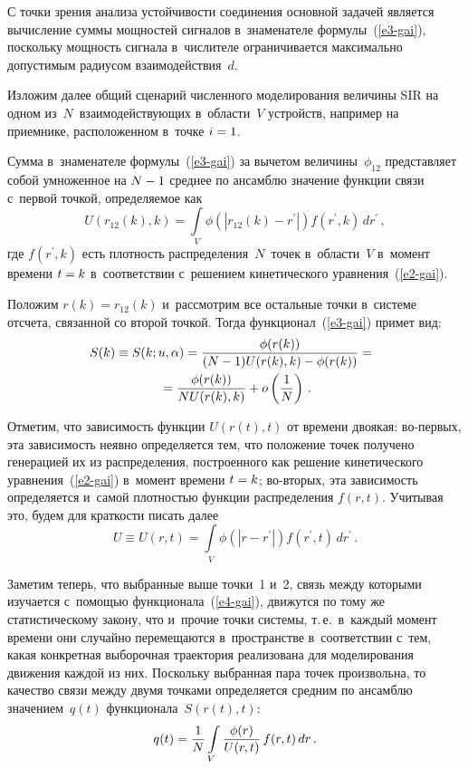 \begin{multicols}{2}
  С точки зрения анализа устойчивости соединения основной задачей является 
вычисление суммы мощностей сигналов в~знаменателе формулы~(\ref{e3-gai}), 
поскольку мощность сигнала в~числителе ограничивается максимально 
допустимым радиусом взаимодействия~$d$.
  
  Изложим далее общий сценарий численного моделирования величины SIR на 
одном из~$N$~взаимодействующих в~области~$V$ устройств, например на 
приемнике, расположенном в~точке $i\hm=1$.
  
  Сумма в~знаменателе формулы~(\ref{e3-gai}) за вычетом 
величины~$\phi_{12}$ представляет собой умноженное на $N\hm-1$ среднее по 
ансамблю значение функции связи с~первой точкой, определяемое как 
  $$
  U\left( r_{12}(k),k\right) =\int\limits_V \phi\left( \left\vert r_{12}(k)-
r^\prime\right\vert \right) f\left( r^\prime, k\right)\,dr^\prime\,,
  $$ 
где $f(r^\prime, k)$ есть плотность распределения~$N$~точек в~об\-ласти~$V$ 
в~момент времени $t\hm=k$ в~соответствии с~решением кинетического 
уравнения~(\ref{e2-gai}).

  Положим $r(k)=r_{12}(k)$ и~рассмотрим все остальные точки в~системе 
отсчета, связанной со второй точкой. Тогда функционал~(\ref{e3-gai}) примет 
вид:
  \begin{multline*}
 \hspace*{-4.2027pt} S(k)\equiv S(k;u,\alpha) = \displaystyle\frac{\displaystyle \phi(r(k))\mathstrut}{\displaystyle (N-1)U(r(k),k)-\phi(r(k))\mathstrut}= {}\\
  {}=
\displaystyle\frac{\displaystyle \phi(r(k))\mathstrut}{\displaystyle NU(r(k),k)\mathstrut}+o\left( \displaystyle\frac{\displaystyle 1\mathstrut}{\displaystyle N\mathstrut}\right)\,.
  \end{multline*}
  
  Отметим, что зависимость функции $U(r(t),t)$ от времени двоякая:  
во-пер\-вых, эта зависимость неявно определяется тем, что положение точек 
получено генерацией их из распределения, построенного как решение 
кинетического уравнения~(\ref{e2-gai}) в~момент времени $t\hm=k$;  
во-вто\-рых, эта зависимость определяется и~самой плот\-ностью функ\-ции
рас\-пре\-де\-ле\-ния $f(r,t)$. Учитывая это, 
будем для краткости писать далее
  \begin{equation}
  U\equiv U(r,t)=\int\limits_V \phi\left(\left\vert r-r^\prime\right\vert \right) 
f\left(r^\prime, t\right)\,dr^\prime\,.
  \label{e4-gai}
  \end{equation}
  
  Заметим теперь, что выбранные выше точки~1 и~2, связь между которыми 
изучается с~помощью функционала~(\ref{e4-gai}), движутся по тому же 
статистическому закону, что и~прочие точки системы, т.\,е.\ в~каж\-дый момент 
времени они случайно перемещаются в~пространстве в~соответствии с~тем, 
какая конкретная выборочная траектория реализована для моделирования 
движения каждой из них. Поскольку выбранная пара точек произвольна, то 
качество связи между двумя точками определяется средним по ансамблю 
значением~$q(t)$ функционала~$S(r(t),t)$:
  \begin{equation}
  q(t)=\displaystyle\frac{\displaystyle 1\mathstrut}{\displaystyle N\mathstrut}\int\limits_V \displaystyle\frac{\displaystyle \phi(r)\mathstrut}{\displaystyle U(r,t)\mathstrut}\,f(r,t)\,dr\,.
  \label{e5-gai}
  \end{equation}
  

\end{multicols}
